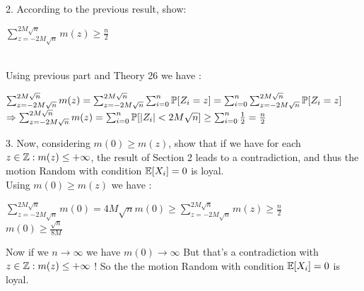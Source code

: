 \documentclass[30pt]{article}
\begin{document}
{\color{blue} {\large 2. }According to the previous result, show:
\begin{center}
    $\sum_{z= -2M\sqrt{n}}^{2M\sqrt{n}} m(z)\ge \frac{n}{2} $
\end{center}
} \\ \newline
Using previous part and {\color{blue} Theory 26} we have :
\begin{center}
    $\sum_{z= -2M\sqrt{n}}^{2M\sqrt{n}} m(z) = \sum_{z= -2M\sqrt{n}}^{2M\sqrt{n}} \sum_{i=0}^{n} \Bbb{P} [Z_i = z] = \sum_{i=0}^{n} \sum_{z= -2M\sqrt{n}}^{2M\sqrt{n}} \Bbb{P} [Z_i = z] $ \vspace{0.3cm} \\ 
    $\Rightarrow \sum_{z= -2M\sqrt{n}}^{2M\sqrt{n}} m(z) = \sum_{i=0}^{n} \Bbb{P}[|Z_i| < 2M\sqrt{n}] \ge \sum_{i=0}^{n} \frac{1}{2} = \frac{n}{2} $
\end{center}

{\color{blue} {\large 3. }Now, considering $m(0) \ge m(z) $, show that if we have for each $z \in \Bbb{Z} : m(z) \le + \infty$, the result of {\color{blue}Section 2} leads to a contradiction, and thus the motion Random with condition $\Bbb{E}[X_i] = 0 $ is loyal.
} \\ \newline
Using $m(0) \ge m(z) $ we have : 
\begin{center}
    $\sum_{z= -2M\sqrt{n}}^{2M\sqrt{n}} m(0) = 4M\sqrt{n}m(0) \ge \sum_{z= -2M\sqrt{n}}^{2M\sqrt{n}} m(z) \ge \frac{n}{2} $ \\
    $m(0) \ge \frac{\sqrt{n}}{8M} $
\end{center} 
Now if we $n \to \infty $ we have $m(0) \to \infty $ But that's a contradiction with $z \in \Bbb{Z} : m(z) \le + \infty$ ! So the the motion Random with condition $\Bbb{E}[X_i] = 0 $ is loyal. \\
\end{document}
